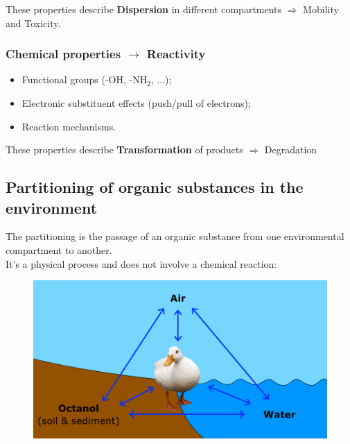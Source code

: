 \documentclass{article}
\begin{document}
These properties describe \textbf{Dispersion} in different compartments $\Rightarrow$ Mobility and Toxicity.

\subsubsection{Chemical properties $\rightarrow$ Reactivity}
\begin{itemize}
    \item Functional groups (-OH, -NH$_2$, ...);
    \item Electronic substituent effects (push/pull of electrons);
    \item Reaction mechanisms.
\end{itemize}

These properties describe \textbf{Transformation} of products $\Rightarrow$ Degradation

\subsection{Partitioning of organic substances in the environment}
The partitioning is the passage of an organic substance from one environmental
compartment to another.\\ It's a physical process and does not involve a chemical reaction:


\setlength{\intextsep}{0pt}%
\begin{figure}
    \vspace*{1.5cm}
    \includegraphics[width=.55\textwidth]{media/partitioning.png}
\end{figure}

\phantom{}
\end{document}
